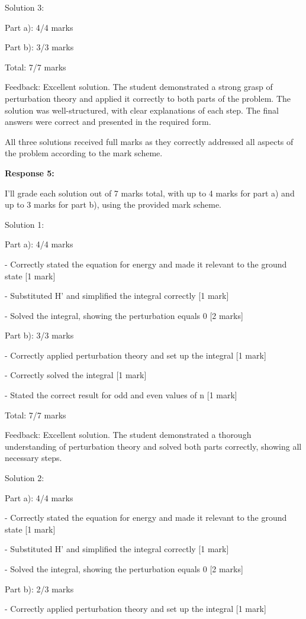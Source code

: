\documentclass[a4paper,11pt]{article}
\begin{document}
Solution 3:

Part a): 4/4 marks

Part b): 3/3 marks

Total: 7/7 marks

Feedback: Excellent solution. The student demonstrated a strong grasp of perturbation theory and applied it correctly to both parts of the problem. The solution was well-structured, with clear explanations of each step. The final answers were correct and presented in the required form.

All three solutions received full marks as they correctly addressed all aspects of the problem according to the mark scheme.

\bigskip
\textbf{Response 5:}

I'll grade each solution out of 7 marks total, with up to 4 marks for part a) and up to 3 marks for part b), using the provided mark scheme.

Solution 1:

Part a): 4/4 marks

- Correctly stated the equation for energy and made it relevant to the ground state [1 mark]

- Substituted H' and simplified the integral correctly [1 mark]

- Solved the integral, showing the perturbation equals 0 [2 marks]

Part b): 3/3 marks

- Correctly applied perturbation theory and set up the integral [1 mark]

- Correctly solved the integral [1 mark]

- Stated the correct result for odd and even values of n [1 mark]

Total: 7/7 marks

Feedback: Excellent solution. The student demonstrated a thorough understanding of perturbation theory and solved both parts correctly, showing all necessary steps.

Solution 2:

Part a): 4/4 marks

- Correctly stated the equation for energy and made it relevant to the ground state [1 mark]

- Substituted H' and simplified the integral correctly [1 mark]

- Solved the integral, showing the perturbation equals 0 [2 marks]

Part b): 2/3 marks

- Correctly applied perturbation theory and set up the integral [1 mark]
\end{document}
